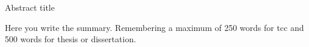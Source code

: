 \documentclass[tg]{mdtufsm}
\begin{document}
\begin{englishabstract}
{Abstract title}
\ %
\ %
\ %


Here you write the summary. Remembering a maximum of 250 words for tcc and 500 words for thesis or dissertation.

\end{englishabstract}


\listoffigures
\listoftables



\end{document}
